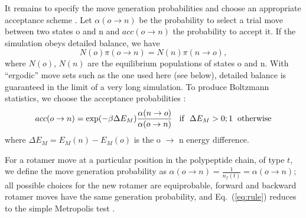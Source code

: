 \documentclass[a4paper,12pt]{article}
\begin{document}
It remains to specify the move generation probabilities and choose an appropriate acceptance scheme \cite{Metropolis53,
FrenkelBK,GrimmetBK}. Let $\alpha(o \rightarrow n)$ be the probability to select a trial move between two states
o and n and $acc(o \rightarrow n)$ the probability to accept it. If the simulation obeys detailed balance, we have
\begin{equation}
N(o) \pi(o \rightarrow n) = N(n) \pi(n \rightarrow o), \label{eq:balance}
\end{equation}
where $N(o)$, $N(n)$ are the equilibrium populations of states o and n. With ``ergodic'' move sets such as the one
used here (see below), detailed balance is guaranteed in the limit of a very long simulation. To produce Boltzmann
statistics, we choose the acceptance probabilities \cite{Metropolis53,FrenkelBK,GrimmetBK}:
\begin{equation} \label{eq:rule}
acc(o \rightarrow n) = \exp(-\beta \Delta E_M) \frac{ \alpha(n \rightarrow o) }{ \alpha(o \rightarrow n) }
{\rm \hspace*{3mm} if \hspace*{2mm} } \Delta E_M > 0; 1 {\rm \hspace*{2mm} otherwise}
\end{equation}
where $\Delta E_M = E_M(n) - E_M(o)$ is the o $\rightarrow$ n energy difference. 

For a rotamer move at a particular position in the polypeptide chain, of type $t$, we define the move generation
probability as $\alpha(o \rightarrow n) = \frac{1}{n_f(t)} = \alpha(o \rightarrow n)$; all possible choices for
the new rotamer are equiprobable, forward and backward rotamer moves have the same generation probability, and
Eq.\ (\ref{eq:rule}) reduces to the simple Metropolis test \cite{Metropolis53}.
\end{document}
